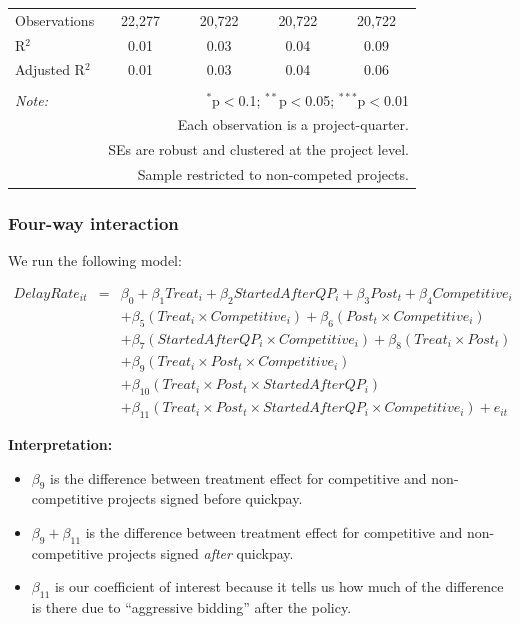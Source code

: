 \documentclass[
]{article}
\providecommand{\tightlist}{%
  \setlength{\itemsep}{0pt}\setlength{\parskip}{0pt}}
\begin{document}
\begin{table}[H]
\begin{tabular}{@{\extracolsep{-2pt}}lcccc}
Observations & 22,277 & 20,722 & 20,722 & 20,722 \\ 
R$^{2}$ & 0.01 & 0.03 & 0.04 & 0.09 \\ 
Adjusted R$^{2}$ & 0.01 & 0.03 & 0.04 & 0.06 \\ 
\hline 
\hline \\[-1.8ex] 
\textit{Note:}  & \multicolumn{4}{r}{$^{*}$p$<$0.1; $^{**}$p$<$0.05; $^{***}$p$<$0.01} \\ 
 & \multicolumn{4}{r}{Each observation is a project-quarter.} \\ 
 & \multicolumn{4}{r}{SEs are robust and clustered at the project level.} \\ 
 & \multicolumn{4}{r}{Sample restricted to non-competed projects.} \\ 
\end{tabular} 
\end{table}

\hypertarget{four-way-interaction}{%
\subsubsection{Four-way interaction}\label{four-way-interaction}}

We run the following model:

\[\begin{aligned} DelayRate_{it} &=& \beta_0 +\beta_1 Treat_i+ \beta_2 StartedAfterQP_i+ \beta_3 Post_t+ \beta_4 Competitive_i\\ && +  \beta_5 (Treat_i \times Competitive_i) + \beta_6 (Post_t \times Competitive_i)\\ && +  \beta_7 (StartedAfterQP_i \times Competitive_i) +\beta_8 (Treat_i \times Post_t)\\ && + \beta_9 (Treat_i \times Post_t \times Competitive_i) \\ && + \beta_{10} (Treat_i \times Post_t \times StartedAfterQP_i )\\ && + \beta_{11} (Treat_i \times Post_t \times StartedAfterQP_i \times Competitive_i) + e_{it} \end{aligned}\]

\textbf{Interpretation:}

\begin{itemize}
\tightlist
\item
  \(\beta_9\) is the difference between treatment effect for competitive
  and non-competitive projects signed before quickpay.
\item
  \(\beta_9 + \beta_{11}\) is the difference between treatment effect
  for competitive and non-competitive projects signed \emph{after}
  quickpay.
\item
  \(\beta_{11}\) is our coefficient of interest because it tells us how
  much of the difference is there due to ``aggressive bidding'' after
  the policy.
\end{itemize}
\end{document}
